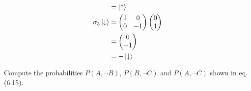 \documentclass[12pt]{book} %
\numberwithin{equation}{chapter}
\def\s{\sigma}
\begin{document}
\begin{solbox}
\begin{align*}
&=\ket{\uparrow}\\
\s_{3}\ket{\downarrow}&=
\begin{pmatrix}
1&0\\
0&-1
\end{pmatrix}
\begin{pmatrix}
0\\
1
\end{pmatrix}\\
&=
\begin{pmatrix}
0\\
-1
\end{pmatrix}\\
&=-\ket{\downarrow}
\end{align*}
\end{solbox}

\begin{problem}
Compute the probabilities $P(A, \neg B)$, $P(B, \neg C)$ and $P(A, \neg C)$ shown in eq. (6.15).
\end{problem}
\end{document}
